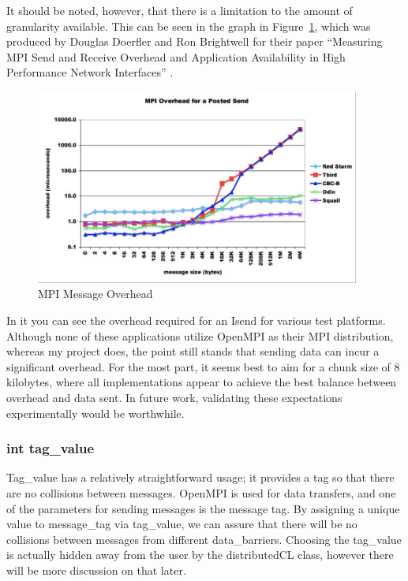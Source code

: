 \documentclass[../thesis.tex]{subfiles}
\begin{document}
      It should be noted, however, that there is a limitation to the amount of granularity available. This can be seen in the graph in Figure~\ref{fig:message_overhead}, which was produced by Douglas Doerfler and Ron Brightwell for their paper ``Measuring MPI Send and Receive Overhead and Application Availability in High Performance Network Interfaces'' \cite{mpioverhead}.

      \begin{figure}[htbp]
        \centering
        \includegraphics[width=0.95\textwidth]{diagrams/message_overhead.png}
        \caption{MPI Message Overhead}
        \label{fig:message_overhead}
      \end{figure}

    In it you can see the overhead required for an Isend for various test platforms. Although none of these applications utilize OpenMPI as their MPI distribution, whereas my project does, the point still stands that sending data can incur a significant overhead. For the most part, it seems best to aim for a chunk size of 8 kilobytes, where all implementations appear to achieve the best balance between overhead and data sent. In future work, validating these expectations experimentally would be worthwhile.

  \subsubsection{int tag\_value} %
  \label{ssub:int_tag_value}
    Tag\_value has a relatively straightforward usage; it provides a tag so that there are no collisions between messages. OpenMPI is used for data transfers, and one of the parameters for sending messages is the message tag. By assigning a unique value to message\_tag via tag\_value, we can assure that there will be no collisions between messages from different data\_barriers. Choosing the tag\_value is actually hidden away from the user by the distributedCL class, however there will be more discussion on that later.
\end{document}
